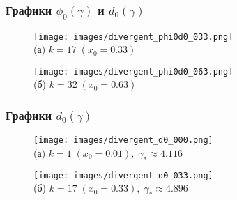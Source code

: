 \documentclass[fullscreen=true, unicode, bookmarks=false]{beamer}
\begin{document}
\begin{frame}
\frametitle{ Графики $ \phi_0(\gamma) $ и $ d_0(\gamma) $ }

\begin{figure} 
\begin{minipage}[h]{0.49\linewidth}
\begin{center}
\texttt{[image: images/divergent\_phi0d0\_033.png]} \\ (а) $ k=17 \; (x_0=0.33) $
\end{center}
\end{minipage} 
\hfill
\begin{minipage}[h]{0.49\linewidth}
\begin{center}
\texttt{[image: images/divergent\_phi0d0\_063.png]}  \\ (б) $ k=32 \; (x_0=0.63) $
\end{center}
\end{minipage} 
\end{figure}

\end{frame}

\begin{frame}
\frametitle{ Графики $ d_0(\gamma) $ }

\begin{figure} 
\begin{minipage}[h]{0.49\linewidth}
\begin{center}
\texttt{[image: images/divergent\_d0\_000.png]} \\ (а) $ k=1 \; (x_0=0.01), \; \gamma_*\approx 4.116 $
\end{center}
\end{minipage} 
\hfill
\begin{minipage}[h]{0.49\linewidth}
\begin{center}
\texttt{[image: images/divergent\_d0\_033.png]}  \\ (б) $ k=17 \; (x_0=0.33), \; \gamma_*\approx 4.896 $
\end{center}
\end{minipage} 
\end{figure}

\end{frame}
\end{document}
